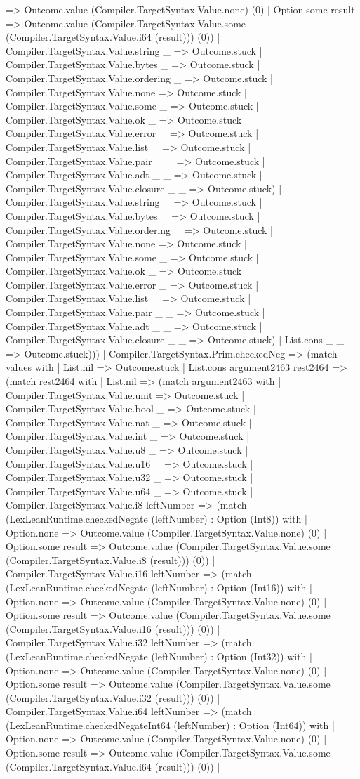 \documentclass[11pt]{article}
\begin{document}
=> Outcome.value (Compiler.TargetSyntax.Value.none) (0) | Option.some result => Outcome.value (Compiler.TargetSyntax.Value.some (Compiler.TargetSyntax.Value.i64 (result))) (0)) | Compiler.TargetSyntax.Value.string \_ => Outcome.stuck | Compiler.TargetSyntax.Value.bytes \_ => Outcome.stuck | Compiler.TargetSyntax.Value.ordering \_ => Outcome.stuck | Compiler.TargetSyntax.Value.none => Outcome.stuck | Compiler.TargetSyntax.Value.some \_ => Outcome.stuck | Compiler.TargetSyntax.Value.ok \_ => Outcome.stuck | Compiler.TargetSyntax.Value.error \_ => Outcome.stuck | Compiler.TargetSyntax.Value.list \_ => Outcome.stuck | Compiler.TargetSyntax.Value.pair \_ \_ => Outcome.stuck | Compiler.TargetSyntax.Value.adt \_ \_ => Outcome.stuck | Compiler.TargetSyntax.Value.closure \_ \_ => Outcome.stuck) | Compiler.TargetSyntax.Value.string \_ => Outcome.stuck | Compiler.TargetSyntax.Value.bytes \_ => Outcome.stuck | Compiler.TargetSyntax.Value.ordering \_ => Outcome.stuck | Compiler.TargetSyntax.Value.none => Outcome.stuck | Compiler.TargetSyntax.Value.some \_ => Outcome.stuck | Compiler.TargetSyntax.Value.ok \_ => Outcome.stuck | Compiler.TargetSyntax.Value.error \_ => Outcome.stuck | Compiler.TargetSyntax.Value.list \_ => Outcome.stuck | Compiler.TargetSyntax.Value.pair \_ \_ => Outcome.stuck | Compiler.TargetSyntax.Value.adt \_ \_ => Outcome.stuck | Compiler.TargetSyntax.Value.closure \_ \_ => Outcome.stuck) | List.cons \_ \_ => Outcome.stuck))) | Compiler.TargetSyntax.Prim.checkedNeg => (match values with | List.nil => Outcome.stuck | List.cons argument2463 rest2464 => (match rest2464 with | List.nil => (match argument2463 with | Compiler.TargetSyntax.Value.unit => Outcome.stuck | Compiler.TargetSyntax.Value.bool \_ => Outcome.stuck | Compiler.TargetSyntax.Value.nat \_ => Outcome.stuck | Compiler.TargetSyntax.Value.int \_ => Outcome.stuck | Compiler.TargetSyntax.Value.u8 \_ => Outcome.stuck | Compiler.TargetSyntax.Value.u16 \_ => Outcome.stuck | Compiler.TargetSyntax.Value.u32 \_ => Outcome.stuck | Compiler.TargetSyntax.Value.u64 \_ => Outcome.stuck | Compiler.TargetSyntax.Value.i8 leftNumber => (match (LexLeanRuntime.checkedNegate (leftNumber) : Option (Int8)) with | Option.none => Outcome.value (Compiler.TargetSyntax.Value.none) (0) | Option.some result => Outcome.value (Compiler.TargetSyntax.Value.some (Compiler.TargetSyntax.Value.i8 (result))) (0)) | Compiler.TargetSyntax.Value.i16 leftNumber => (match (LexLeanRuntime.checkedNegate (leftNumber) : Option (Int16)) with | Option.none => Outcome.value (Compiler.TargetSyntax.Value.none) (0) | Option.some result => Outcome.value (Compiler.TargetSyntax.Value.some (Compiler.TargetSyntax.Value.i16 (result))) (0)) | Compiler.TargetSyntax.Value.i32 leftNumber => (match (LexLeanRuntime.checkedNegate (leftNumber) : Option (Int32)) with | Option.none => Outcome.value (Compiler.TargetSyntax.Value.none) (0) | Option.some result => Outcome.value (Compiler.TargetSyntax.Value.some (Compiler.TargetSyntax.Value.i32 (result))) (0)) | Compiler.TargetSyntax.Value.i64 leftNumber => (match (LexLeanRuntime.checkedNegateInt64 (leftNumber) : Option (Int64)) with | Option.none => Outcome.value (Compiler.TargetSyntax.Value.none) (0) | Option.some result => Outcome.value (Compiler.TargetSyntax.Value.some (Compiler.TargetSyntax.Value.i64 (result))) (0)) | 
\end{document}
